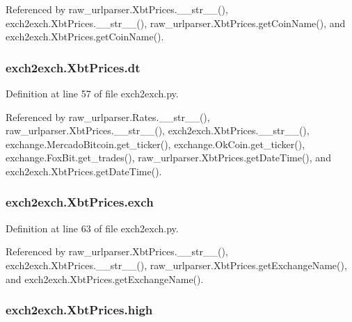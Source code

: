 Referenced by raw\-\_\-urlparser.\-Xbt\-Prices.\-\_\-\-\_\-str\-\_\-\-\_\-(), exch2exch.\-Xbt\-Prices.\-\_\-\-\_\-str\-\_\-\-\_\-(), raw\-\_\-urlparser.\-Xbt\-Prices.\-get\-Coin\-Name(), and exch2exch.\-Xbt\-Prices.\-get\-Coin\-Name().

\hypertarget{classexch2exch_1_1_xbt_prices_af9f916c683c48631c97f1c5d91447751}{
\subsubsection[{dt}]{\setlength{\rightskip}{0pt plus 5cm}exch2exch.\-Xbt\-Prices.\-dt}}\label{classexch2exch_1_1_xbt_prices_af9f916c683c48631c97f1c5d91447751}


Definition at line 57 of file exch2exch.\-py.



Referenced by raw\-\_\-urlparser.\-Rates.\-\_\-\-\_\-str\-\_\-\-\_\-(), raw\-\_\-urlparser.\-Xbt\-Prices.\-\_\-\-\_\-str\-\_\-\-\_\-(), exch2exch.\-Xbt\-Prices.\-\_\-\-\_\-str\-\_\-\-\_\-(), exchange.\-Mercado\-Bitcoin.\-get\-\_\-ticker(), exchange.\-Ok\-Coin.\-get\-\_\-ticker(), exchange.\-Fox\-Bit.\-get\-\_\-trades(), raw\-\_\-urlparser.\-Xbt\-Prices.\-get\-Date\-Time(), and exch2exch.\-Xbt\-Prices.\-get\-Date\-Time().

\hypertarget{classexch2exch_1_1_xbt_prices_a72caf3a29017a1ceaf4367240a46b360}{
\subsubsection[{exch}]{\setlength{\rightskip}{0pt plus 5cm}exch2exch.\-Xbt\-Prices.\-exch}}\label{classexch2exch_1_1_xbt_prices_a72caf3a29017a1ceaf4367240a46b360}


Definition at line 63 of file exch2exch.\-py.



Referenced by raw\-\_\-urlparser.\-Xbt\-Prices.\-\_\-\-\_\-str\-\_\-\-\_\-(), exch2exch.\-Xbt\-Prices.\-\_\-\-\_\-str\-\_\-\-\_\-(), raw\-\_\-urlparser.\-Xbt\-Prices.\-get\-Exchange\-Name(), and exch2exch.\-Xbt\-Prices.\-get\-Exchange\-Name().

\hypertarget{classexch2exch_1_1_xbt_prices_aeae6235417d65d9e9c768a51c38d5388}{
\subsubsection[{high}]{\setlength{\rightskip}{0pt plus 5cm}exch2exch.\-Xbt\-Prices.\-high}}\label{classexch2exch_1_1_xbt_prices_aeae6235417d65d9e9c768a51c38d5388}


